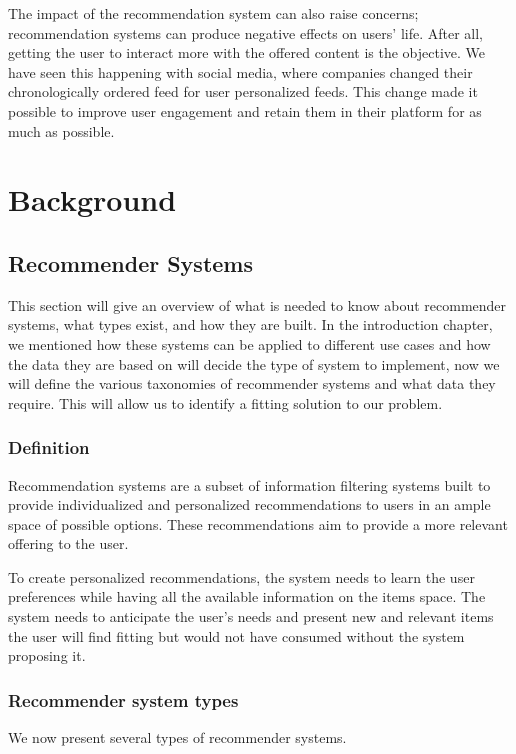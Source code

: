 \documentclass{kththesis}
\begin{document}
The impact of the recommendation system can also raise concerns; recommendation systems can produce negative effects on users' life. After all, getting the user to interact more with the offered content is the objective. We have seen this happening with social media, where companies changed their chronologically ordered feed for user personalized feeds. This change made it possible to improve user engagement and retain them in their platform for as much as possible.

\chapter{Background}
\section{Recommender Systems}
This section will give an overview of what is needed to know about recommender systems, what types exist, and how they are built. In the introduction chapter, we mentioned how these systems can be applied to different use cases and how the data they are based on will decide the type of system to implement, now we will define the various taxonomies of recommender systems and what data they require. This will allow us to identify a fitting solution to our problem.

\subsection{Definition}
Recommendation systems are a subset of information filtering systems built to provide individualized and personalized recommendations to users in an ample space of possible options. These recommendations aim to provide a more relevant offering to the user.

To create personalized recommendations, the system needs to learn the user preferences while having all the available information on the items space. The system needs to anticipate the user's needs and present new and relevant items the user will find fitting but would not have consumed without the system proposing it.

\subsection{Recommender system types}

We now present several types of recommender systems.
\end{document}
